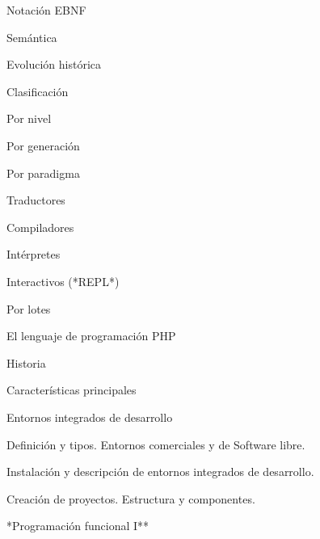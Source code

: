 \begin{longenum}
\begin{longenum}
\begin{longenum}
\begin{longenum}
\begin{longenum}
                    \item Notación EBNF
                \end{longenum}
                \item Semántica
            \end{longenum}
            \item Evolución histórica
            \item Clasificación
            \begin{longenum}
                \item Por nivel
                \item Por generación
                \item Por paradigma
            \end{longenum}
        \end{longenum}
        \item Traductores
        \begin{longenum}
            \item Compiladores
            \item Intérpretes
            \begin{longenum}
                \item Interactivos (*REPL*)
                \item Por lotes
            \end{longenum}
        \end{longenum}
        \item El lenguaje de programación PHP
        \begin{longenum}
            \item Historia
            \item Características principales
        \end{longenum}
        \item Entornos integrados de desarrollo
        \begin{longenum}
            \item Definición y tipos. Entornos comerciales y de Software libre.
            \item Instalación y descripción de entornos integrados de desarrollo.
            \item Creación de proyectos. Estructura y componentes.
        \end{longenum}
    \end{longenum}
    \item **Programación funcional I**
    \begin{longenum}

\end{longenum}
\end{longenum}
